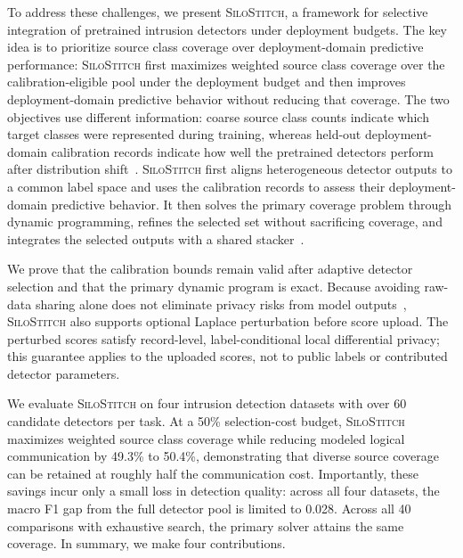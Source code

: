 \documentclass[conference]{IEEEtran}
\theoremstyle{definition}
\newcommand{\Fname}{\textsc{SiloStitch}\xspace}
\begin{document}
To address these challenges, we present \Fname, a framework for selective integration of pretrained intrusion detectors under deployment budgets.
The key idea is to prioritize source class coverage over deployment-domain predictive performance: \Fname first maximizes weighted source class coverage over the calibration-eligible pool under the deployment budget and then improves deployment-domain predictive behavior without reducing that coverage.
The two objectives use different information: coarse source class counts indicate which target classes were represented during training, whereas held-out deployment-domain calibration records indicate how well the pretrained detectors perform after distribution shift~\cite{yang2021cade}.
\Fname first aligns heterogeneous detector outputs to a common label space and uses the calibration records to assess their deployment-domain predictive behavior.
It then solves the primary coverage problem through dynamic programming, refines the selected set without sacrificing coverage, and integrates the selected outputs with a shared stacker~\cite{wolpert1992stacked}.

We prove that the calibration bounds remain valid after adaptive detector selection and that the primary dynamic program is exact.
Because avoiding raw-data sharing alone does not eliminate privacy risks from model outputs~\cite{ico2023aiguidance}, \Fname also supports optional Laplace perturbation before score upload.
The perturbed scores satisfy record-level, label-conditional local differential privacy; this guarantee applies to the uploaded scores, not to public labels or contributed detector parameters.

We evaluate \Fname on four intrusion detection datasets with over 60 candidate detectors per task.
At a 50\% selection-cost budget, \Fname maximizes weighted source class coverage while reducing modeled logical communication by 49.3\% to 50.4\%, demonstrating that diverse source coverage can be retained at roughly half the communication cost.
Importantly, these savings incur only a small loss in detection quality: across all four datasets, the macro F1 gap from the full detector pool is limited to 0.028.
Across all 40 comparisons with exhaustive search, the primary solver attains the same coverage.
In summary, we make four contributions.
\end{document}
